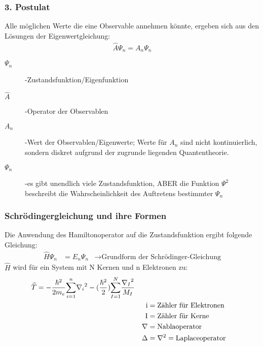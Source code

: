 \documentclass[12pt,a4paper,oneside,normalheadings,abstracton,liststotoc,bibtotoc,titlepage,pdftex]{scrartcl}
\begin{document}
\subsubsection*{3. Postulat}
Alle möglichen Werte die eine Observable annehmen könnte, ergeben sich aus den Lösungen der Eigenwertgleichung:
\begin{align}
\widehat{A}\Psi _n = A_n \Psi _n
\end{align}
\begin{description}
\item[$\Psi _n$]-Zustandsfunktion/Eigenfunktion
\item[$\widehat{A}$]-Operator der Observablen
\item[$A_n$]-Wert der Observablen/Eigenwerte; Werte für $A_n$ sind nicht kontinuierlich, sondern diskret aufgrund der zugrunde liegenden Quantentheorie.
\item[$\Psi _n$]-es gibt unendlich viele Zustandsfunktion, ABER die Funktion $\Psi ^2$ beschreibt die Wahrscheinlichkeit des Auftretens bestimmter $\Psi _n$
\end{description}

\subsubsection{Schrödingergleichung und ihre Formen}
Die Anwendung des Hamiltonoperator auf die Zustandsfunktion ergibt folgende Gleichung:
\begin{align}
\widehat{H}\Psi _n &= E_n \Psi _n & \rightarrow \text{Grundform der Schrödinger-Gleichung}
\end{align}
$\widehat{H}$ wird für ein System mit N Kernen und n Elektronen zu:
\begin{align}
\widehat{T} &= - \dfrac{\hbar^2}{2m_e} \overset{n}{\underset{i=1}{\sum}} {\nabla_i}^2 - (\dfrac{\hbar^2}{2}) \overset{N}{\underset{I=1}{\sum}} \dfrac{{\nabla_I}^2}{M_I} &\\
\notag && \text{i} &= \text{Zähler für Elektronen} \\
\notag && \text{I} &= \text{Zähler für Kerne}\\
\notag && \nabla &= \text{Nablaoperator}\\
\notag && \Delta &= \nabla^2 = \text{Laplaceoperator}
\end{align}
\end{document}
